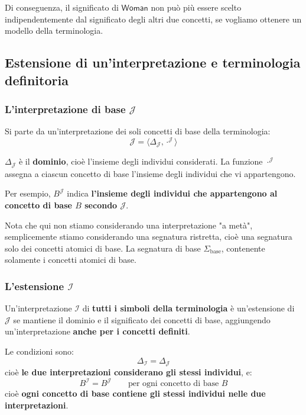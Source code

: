 Di conseguenza, il significato di \(\mathsf{Woman}\) non può più essere scelto indipendentemente dal significato degli altri due concetti, se vogliamo ottenere un modello della terminologia.

\subsection{Estensione di un'interpretazione e terminologia definitoria}

\subsubsection{L'interpretazione di base $\mathcal{J}$}

Si parte da un'interpretazione dei soli concetti di base della terminologia:
\[
    \mathcal{J} = \langle \Delta_{\mathcal{J}},
    \cdot^{\mathcal{J}} \rangle
\]

$\Delta_{\mathcal{J}}$ è il \textbf{dominio}, cioè l'insieme
degli individui considerati. La funzione $\cdot^{\mathcal{J}}$
assegna a ciascun concetto di base l'insieme degli individui
che vi appartengono.

Per esempio, $B^{\mathcal{J}}$ indica \textbf{l'insieme degli
individui che appartengono al concetto di base $B$ secondo
$\mathcal{J}$}.

\begin{observation}{}
    Nota che qui non stiamo considerando una interpretazione "a metà", semplicemente stiamo considerando una segnatura ristretta, cioè una segnatura solo dei concetti atomici di base.
    La segnatura di base \(\Sigma_{\mathrm{base}}\), contenente solamente i concetti atomici di base.
\end{observation}

\subsubsection{L'estensione $\mathcal{I}$}

Un'interpretazione $\mathcal{I}$ di \textbf{tutti i simboli
della terminologia} è un'estensione di $\mathcal{J}$ se
mantiene il dominio e il significato dei concetti di base,
aggiungendo un'interpretazione \textbf{anche per i concetti definiti}.

Le condizioni sono:
\[
    \Delta_{\mathcal{I}} = \Delta_{\mathcal{J}}
\]
cioè \textbf{le due interpretazioni considerano gli stessi
individui}, e:
\[
    B^{\mathcal{I}} = B^{\mathcal{J}}
    \qquad \text{per ogni concetto di base } B
\]
cioè \textbf{ogni concetto di base contiene gli stessi
individui nelle due interpretazioni}.

